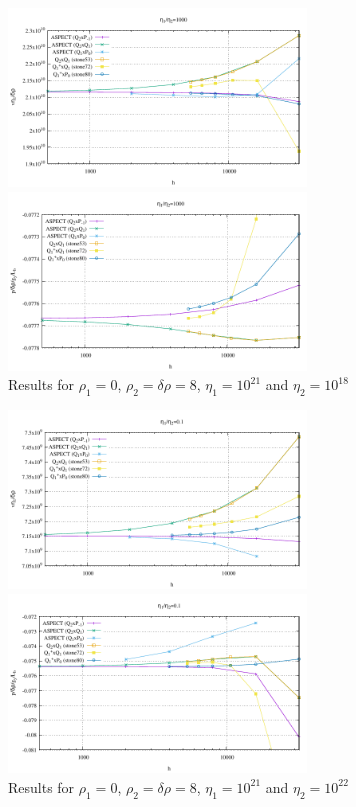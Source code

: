 \begin{center}
\includegraphics[width=7.9cm]{images/benchmark_sinkingblock/eta2_1e18/v.pdf}
\includegraphics[width=7.9cm]{images/benchmark_sinkingblock/eta2_1e18/p.pdf}\\
{\captionfont Results for $\rho_1=0$, $\rho_2=\delta\rho=8$, $\eta_1=10^{21}$ and $\eta_2=10^{18}$}
\end{center}

\begin{center}
\includegraphics[width=7.9cm]{images/benchmark_sinkingblock/eta2_1e22/v.pdf}
\includegraphics[width=7.9cm]{images/benchmark_sinkingblock/eta2_1e22/p.pdf}\\
{\captionfont Results for $\rho_1=0$, $\rho_2=\delta\rho=8$, $\eta_1=10^{21}$ and $\eta_2=10^{22}$}
\end{center}

